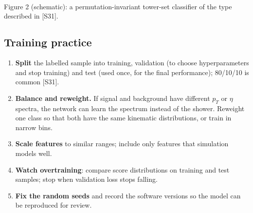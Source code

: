 \documentclass[11pt,letterpaper]{article}
\begin{document}
\begin{center}
\\[2pt]
{\small Figure 2 (schematic): a permutation-invariant tower-set classifier of the type described in [S31].}
\end{center}

\subsection{Training practice}
\begin{enumerate}
\item \textbf{Split} the labelled sample into training, validation (to choose hyperparameters and stop training) and test (used once,
for the final performance); 80/10/10 is common [S31].
\item \textbf{Balance and reweight.} If signal and background have different $p_T$ or $\eta$ spectra, the network can learn the spectrum
instead of the shower. Reweight one class so that both have the same kinematic distributions, or train in narrow bins.
\item \textbf{Scale features} to similar ranges; include only features that simulation models well.
\item \textbf{Watch overtraining}: compare score distributions on training and test samples; stop when validation loss stops falling.
\item \textbf{Fix the random seeds} and record the software versions so the model can be reproduced for review.
\end{enumerate}
\end{document}
